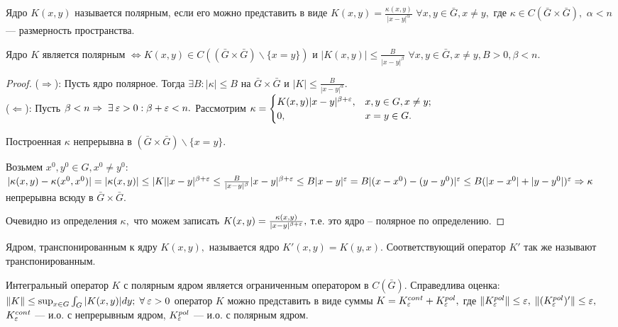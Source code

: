 \begin{definition}
Ядро $K(x,y)$ называется полярным, если его можно представить в виде $K(x,y) = \frac{\kappa(x,y)}{|x-y|^\alpha}$ $\forall x,y \in \bar G, x\ne y,$ где $\kappa \in C(\bar G \times \bar G),$ $\alpha < n$ --- размерность пространства.
\end{definition}

\begin{lemma}
Ядро $K$ является полярным $\Leftrightarrow K(x,y) \in C((\bar G \times \bar G)\backslash\{x=y\})$ и $|K(x,y)| \le \frac{B}{|x-y|^\beta}$ $\forall x, y \in \bar G, x \ne y, B>0, \beta < n.$
\end{lemma}

\begin{proof}
($\Rightarrow$): Пусть ядро полярное. Тогда $\exists B: |\kappa| \le B$ на $\bar G \times \bar G$ и $|K| \le \frac{B}{|x-y|^\alpha}.$
\\
($\Leftarrow$): Пусть $\beta < n \Rightarrow \exists \eps > 0: \beta+\eps < n.$ Рассмотрим $\kappa =  \begin{cases}
   K(x,y)|x-y|^{\beta+\varepsilon}, &x,y\in G, x\ne y;\\
   0, & x=y\in G.
 \end{cases}
$

Построенная $\kappa$ непрерывна в $(\bar G \times \bar G)\backslash\{x=y\}.$

Возьмем $x^0,y^0 \in G, x^0 \ne y^0:$
$|\kappa(x,y) - \kappa(x^0, x^0)| = |\kappa(x,y)| \le |K||x-y|^{\beta+\varepsilon} \le \frac{B}{|x-y|^\beta}|x-y|^{\beta+\varepsilon}\le B|x-y|^\varepsilon = B|(x-x^0)-(y-y^0)|^\varepsilon \le B(|x-x^0|+|y-y^0|)^\varepsilon \Rightarrow \kappa$ непрерывна всюду в $\bar G \times \bar G.$

Очевидно из определения $\kappa,$ что можем записать $K(x,y) = \frac{\kappa(x,y)}{|x-y|^{\beta+\varepsilon}},$ т.е. это ядро -- полярное по определению.
\end{proof}


\begin{definition}
Ядром, транспонированным к ядру $K(x,y),$ называется ядро $K'(x,y) = K(y,x).$ Соответствующий оператор $K'$ так же называют транспонированным.
\end{definition}

\begin{theorem}
Интегральный оператор $K$ с полярным ядром является ограниченным оператором в $C(\bar G).$ Справедлива оценка: $\|K\| \le \sup_{x\in G}\int_G|K(x,y)|dy; \forall \eps > 0$ оператор $K$ можно представить в виде суммы $K = K_\varepsilon^{cont}+K_\varepsilon^{pol},$ где $\|K_\varepsilon^{pol}\| \le \varepsilon,$ $\|(K_\varepsilon^{pol})'\| \le \varepsilon,$ $K_\varepsilon^{cont}$ --- и.о. с непрерывным ядром, $K_\varepsilon^{pol}$ --- и.о. с полярным ядром.
\end{theorem}

